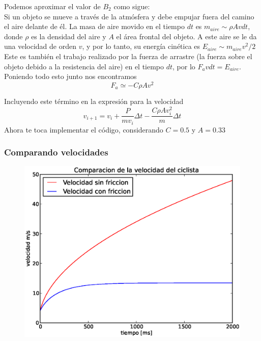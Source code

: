 \begin{frame}
Podemos aproximar el valor de $B_{2}$ como sigue:
\\
\medskip
Si un objeto se mueve a través de la atmósfera y debe empujar fuera del camino el aire delante de él. La masa de aire movido en el tiempo $dt$ es $m_{aire} \sim \rho Avdt$, donde $\rho$ es la densidad del aire y $A$ el área frontal del objeto. A este aire se le da una velocidad de orden $v$, y por lo tanto, su energía cinética es $E_{aire} \sim m_{aire} v^{2} /2$
\\
\medskip
Este es también el trabajo realizado por la fuerza de arrastre (la fuerza sobre el objeto debido a la resistencia del aire) en el tiempo $dt$, por lo $F_{a}vdt = E_{aire}$. Poniendo todo esto junto nos encontramos
\[ F_{a} \simeq - C \rho A v^{2} \]
\end{frame}
\begin{frame}
Incluyendo este término en la expresión para la velocidad
\begin{equation}\label{Eqvelifriccion}
v_{i+1} = v_{i} + \dfrac{P}{m v_{i}} \Delta t - \dfrac{C \rho A v_{i}^{2}}{m} \Delta t
\end{equation}
Ahora te toca implementar el código, considerando $C = 0.5$ y $A=0.33$
\end{frame}
\begin{frame}
\frametitle{Comparando velocidades}
\begin{figure}
	\centering
	\includegraphics[scale=0.5]{EjerBicicleta02.eps}
\end{figure}
\end{frame}
